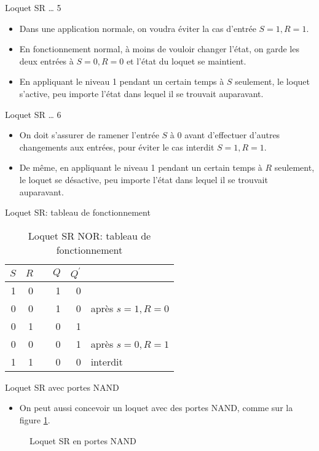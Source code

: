 \documentclass[presentation]{beamer}
\begin{document}
\begin{frame}[label={sec:org6b5bbe3}]{Loquet SR \ldots{} 5}
\begin{itemize}
\item Dans une application normale, on voudra éviter la cas d'entrée \(S=1, R=1\).

\item En fonctionnement normal, à moins de vouloir changer l'état, on garde les deux entrées à \(S=0, R=0\) et l'état du loquet se maintient.

\item En appliquant le niveau 1 pendant un certain temps à \(S\) seulement, le loquet s'active, peu importe l'état dans lequel il se trouvait auparavant.
\end{itemize}
\end{frame}

\begin{frame}[label={sec:orge39d632}]{Loquet SR \ldots{} 6}
\begin{itemize}
\item On doit s'assurer de ramener l'entrée \(S\) à 0 avant d'effectuer d'autres changements aux entrées, pour éviter le cas interdit \(S=1, R=1\).

\item De même, en appliquant le niveau 1 pendant un certain temps à \(R\) seulement, le loquet se désactive, peu importe l'état dans lequel il se trouvait auparavant.
\end{itemize}
\end{frame}

\begin{frame}[label={sec:orgc0086b5}]{Loquet SR: tableau de fonctionnement}
\begin{table}[htbp]
\caption{\label{tab:org2086ad1}Loquet SR NOR: tableau de fonctionnement}
\centering
\begin{tabular}{rrlrrl}
\(S\) & \(R\) &  & \(Q\) & \(Q^\prime\) & \\
\hline
1 & 0 &  & 1 & 0 & \\
0 & 0 &  & 1 & 0 & après \(s=1, R=0\)\\
0 & 1 &  & 0 & 1 & \\
0 & 0 &  & 0 & 1 & après \(s=0, R=1\)\\
1 & 1 &  & 0 & 0 & interdit\\
\end{tabular}
\end{table}
\end{frame}

\begin{frame}[label={sec:org58c67d2}]{Loquet SR avec portes NAND}
\begin{itemize}
\item On peut aussi concevoir un loquet avec des portes NAND, comme sur la figure \ref{fig:orgf1a3b75}.
\end{itemize}

\begin{figure}[htbp]
\centering

\caption{\label{fig:orgf1a3b75}Loquet SR en portes NAND}
\end{figure}
\end{frame}
\end{document}
